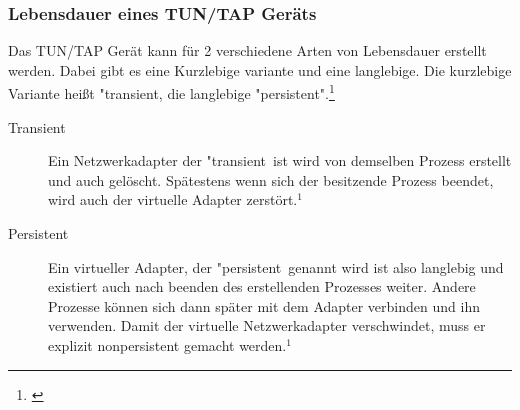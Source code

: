 \subsubsection{Lebensdauer eines TUN/TAP Geräts}
Das TUN/TAP Gerät kann für 2 verschiedene Arten von Lebensdauer erstellt werden. Dabei gibt es eine Kurzlebige variante und eine langlebige. Die kurzlebige Variante heißt "transient\dq , die langlebige "persistent".\footnote[1]{\cite[Vgl.][]{TUNTAP}}
\\
\begin{description}
    \item[Transient] Ein Netzwerkadapter der "transient\dq \ ist wird von demselben Prozess erstellt und auch gelöscht. Spätestens wenn sich der besitzende Prozess beendet, wird auch der virtuelle Adapter zerstört.$^{1}$ 
    \item[Persistent] Ein virtueller Adapter, der "persistent\dq \ genannt wird ist also langlebig und existiert auch nach beenden des erstellenden Prozesses weiter. Andere Prozesse können sich dann später mit dem Adapter verbinden und ihn verwenden. Damit der virtuelle Netzwerkadapter verschwindet, muss er explizit nonpersistent gemacht werden.$^{1}$ 
\end{description}

